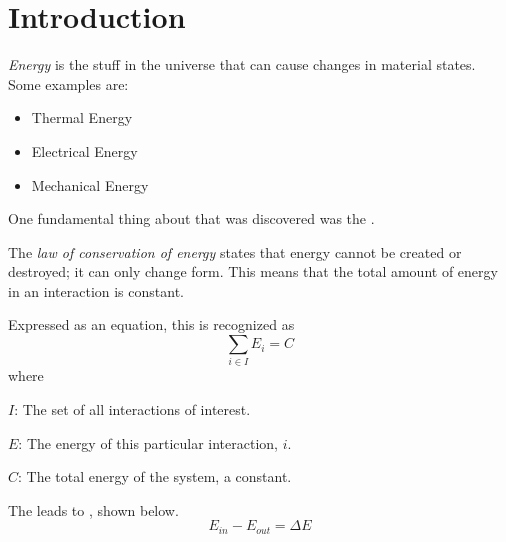 \section{Introduction}\label{sec:Introduction}
\begin{definition}[Energy]\label{def:Energy}
  \emph{Energy} is the stuff in the universe that can cause changes in material states.
  Some examples are:
  \begin{itemize}[noitemsep]
  \item Thermal Energy
  \item Electrical Energy
  \item Mechanical Energy
  \end{itemize}
\end{definition}

One fundamental thing about  that was discovered was the .
\begin{definition}\label{def:Law_Conservation_Energy}
  The \emph{law of conservation of energy} states that energy cannot be created or destroyed; it can only change form.
  This means that the total amount of energy in an interaction is constant.

  Expressed as an equation, this is recognized as
  \begin{equation}\label{eq:Law_Conservation_Energy}
    \sum_{i \in I} E_{i} = C
  \end{equation}
  where
  \begin{description}[noitemsep]
  \item $I$: The set of all interactions of interest.
  \item $E$: The energy of this particular interaction, $i$.
  \item $C$: The total energy of the system, a constant.
  \end{description}
\end{definition}

The  leads to , shown below.
\begin{equation}\label{eq:Energy_Change}
  E_{in} - E_{out} = \Delta E
\end{equation}


